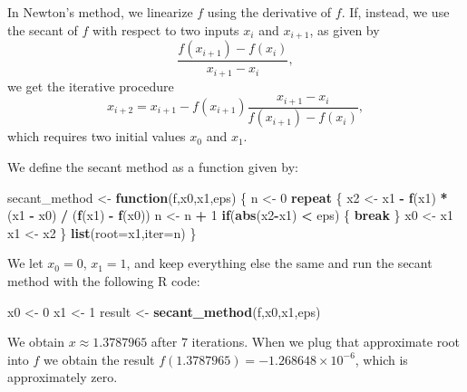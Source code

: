 \documentclass[
  10pt,
  twocolumn]{article}
\newenvironment{Shaded}{\begin{snugshade}}{\end{snugshade}}
\newcommand{\AttributeTok}[1]{\textcolor[rgb]{0.13,0.29,0.53}{#1}}
\newcommand{\ControlFlowTok}[1]{\textcolor[rgb]{0.13,0.29,0.53}{\textbf{#1}}}
\newcommand{\DecValTok}[1]{\textcolor[rgb]{0.00,0.00,0.81}{#1}}
\newcommand{\FunctionTok}[1]{\textcolor[rgb]{0.13,0.29,0.53}{\textbf{#1}}}
\newcommand{\NormalTok}[1]{#1}
\newcommand{\OtherTok}[1]{\textcolor[rgb]{0.56,0.35,0.01}{#1}}
\newcommand{\SpecialCharTok}[1]{\textcolor[rgb]{0.81,0.36,0.00}{\textbf{#1}}}
\begin{document}
In Newton's method, we linearize \(f\) using the derivative of \(f\).
If, instead, we use the secant of \(f\) with respect to two inputs
\(x_i\) and \(x_{i+1}\), as given by \[
  \frac{f(x_{i+1}) - f(x_i)}{x_{i+1}-x_i},
\] we get the iterative procedure \[
  x_{i+2} = x_{i+1} - f(x_{i+1})\frac{x_{i+1}-x_i}{f(x_{i+1}) - f(x_i)},
\] which requires two initial values \(x_0\) and \(x_1\).

We define the secant method as a function given by:

\begin{Shaded}
\begin{Highlighting}[]
\NormalTok{secant\_method }\OtherTok{\textless{}{-}} \ControlFlowTok{function}\NormalTok{(f,x0,x1,eps)}
\NormalTok{\{}
\NormalTok{  n }\OtherTok{\textless{}{-}} \DecValTok{0}
  \ControlFlowTok{repeat}
\NormalTok{  \{}
\NormalTok{    x2 }\OtherTok{\textless{}{-}}\NormalTok{ x1 }\SpecialCharTok{{-}} \FunctionTok{f}\NormalTok{(x1) }\SpecialCharTok{*}\NormalTok{ (x1 }\SpecialCharTok{{-}}\NormalTok{ x0) }\SpecialCharTok{/}\NormalTok{ (}\FunctionTok{f}\NormalTok{(x1) }\SpecialCharTok{{-}} \FunctionTok{f}\NormalTok{(x0))}
\NormalTok{    n }\OtherTok{\textless{}{-}}\NormalTok{ n }\SpecialCharTok{+} \DecValTok{1}
    \ControlFlowTok{if}\NormalTok{(}\FunctionTok{abs}\NormalTok{(x2}\SpecialCharTok{{-}}\NormalTok{x1) }\SpecialCharTok{\textless{}}\NormalTok{ eps)}
\NormalTok{    \{}
      \ControlFlowTok{break}
\NormalTok{    \}}
\NormalTok{    x0 }\OtherTok{\textless{}{-}}\NormalTok{ x1}
\NormalTok{    x1 }\OtherTok{\textless{}{-}}\NormalTok{ x2}
\NormalTok{  \}}
  \FunctionTok{list}\NormalTok{(}\AttributeTok{root=}\NormalTok{x1,}\AttributeTok{iter=}\NormalTok{n)}
\NormalTok{\}}
\end{Highlighting}
\end{Shaded}

We let \(x_0 = 0\), \(x_1 = 1\), and keep everything else the same and
run the secant method with the following R code:

\begin{Shaded}
\begin{Highlighting}[]
\NormalTok{x0 }\OtherTok{\textless{}{-}} \DecValTok{0}
\NormalTok{x1 }\OtherTok{\textless{}{-}} \DecValTok{1}
\NormalTok{result }\OtherTok{\textless{}{-}} \FunctionTok{secant\_method}\NormalTok{(f,x0,x1,eps)}
\end{Highlighting}
\end{Shaded}

We obtain \(x \approx 1.3787965\) after \(7\) iterations. When we plug
that approximate root into \(f\) we obtain the result
\(f(1.3787965) = \ensuremath{-1.268648\times 10^{-6}}\), which is
approximately zero.
\end{document}
